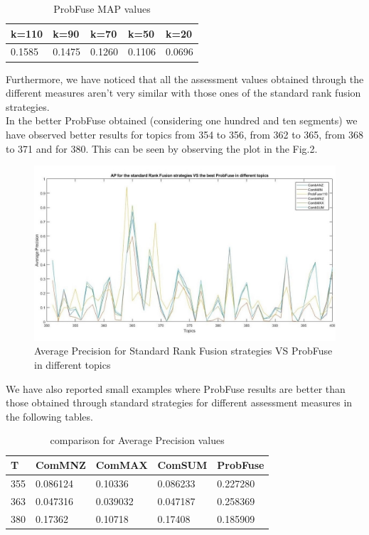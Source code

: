 \documentclass[12pt,journal]{IEEEtran}
\begin{document}
\begin{table}[h!]
\centering
\caption{ProbFuse MAP values}
\begin{tabular}{|l|l|l|l|l|}
\hline
k=110 & k=90 & k=70 & k=50 & k=20\\ \hline
 0.1585 & 0.1475 & 0.1260 & 0.1106  & 0.0696\\ \hline
\end{tabular}
\end{table}

Furthermore, we have noticed that all the assessment values obtained through the different measures aren’t very similar with those ones of the standard rank fusion strategies. \\
In the better ProbFuse obtained (considering one hundred and ten segments) we have observed better results for topics from 354 to 356, from 362 to 365, from 368 to 371 and for 380. This can be seen by observing the plot in the Fig.2. 

\begin{figure}
\includegraphics[scale=0.32]{plot2}
\caption{Average Precision for Standard Rank Fusion strategies VS ProbFuse in different topics}
\label{Average Precision for Standard Rank Fusion strategies VS ProbFuse in different topics}
\end{figure}

We have also reported small examples where ProbFuse results are better than those obtained through standard strategies for different assessment measures in the following tables. \\


\begin{table}[h!]
\centering
\caption{comparison for Average Precision values}
\begin{tabular}{|l|l|l|l|l|}
\hline
T   & ComMNZ    & ComMAX   & ComSUM    & ProbFuse \\ \hline
355 & 0.086124  & 0.10336  & 0.086233  & 0.227280 \\ \hline
363 & 0.047316  & 0.039032 & 0.047187  & 0.258369  \\ \hline
380 & 0.17362   & 0.10718  & 0.17408   & 0.185909  \\ \hline
\end{tabular}
\end{table}
\end{document}
